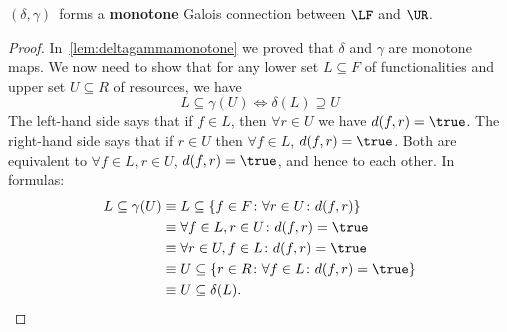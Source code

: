 \begin{lemma}
    $(\delta, \gamma)$~forms a \textbf{monotone} Galois connection between $\LF$ and $\UR$.
\end{lemma}
\begin{proof}
    In~\cref{lem:deltagammamonotone} we proved that $\delta$ and $\gamma$ are monotone maps. We now need to show that for any lower set $L\subseteq F$ of functionalities and upper set $U\subseteq R$ of resources, we have
    \begin{equation}
        L\subseteq\gamma(U) \iff \delta(L)\supseteq U
    \end{equation}
    The left-hand side says that if $f\in L$, then $\forall r \in U$ we have $d(f,r)=\true$. The right-hand side says that if $r\in U$ then $\forall f \in L$, $d(f,r)=\true$. Both are equivalent to $\forall f\in L,r\in U$, $d(f,r)=\true$, and hence to each other. In formulas:
    \begin{equation}
        \begin{aligned}
            L \subseteq \gamma(U)&\equiv L\subseteq \{f \in F\colon \forall r\in U\colon d(f,r)\} \\
            &\equiv \forall f\in L, r\in U \colon d(f,r)=\true \\
            &\equiv \forall r\in U, f\in L \colon d(f,r)=\true\\
            &\equiv U\subseteq \{r\in R\colon \forall f\in L\colon d(f,r)=\true \}\\
            &\equiv U\subseteq \delta(L).
        \end{aligned}
    \end{equation}
\end{proof}
